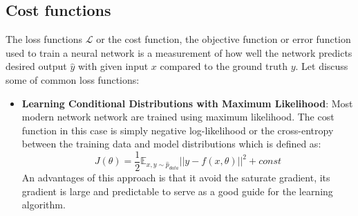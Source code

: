 \subsection{Cost functions}
\hspace{0.45cm}The loss functions $\mathcal{L}$ or the cost function, the objective function or error function used to 
train a neural network is a measurement of how well the network predicts desired output $\hat{y}$ with given input $x$ 
compared to the ground truth $y$\cite{Goodfellow-et-al-2016}. Let discuss some of common loss functions:
\begin{itemize}
    \item \textbf{Learning Conditional Distributions with Maximum Likelihood}:
    Most modern network network are trained using maximum likelihood\cite{Goodfellow-et-al-2016}. The cost function in this case is simply negative log-likelihood or the cross-entropy between the training data and model distributions which is defined as:
    \begin{equation}
        J(\theta) = \frac{1}{2}\mathbb{E}_{x,y\sim\hat{p}_{data}}||y-f(x,\theta)||^2 + const
     \end{equation}
     An advantages of this approach is that it avoid the saturate gradient, its gradient is large and predictable to serve as a good guide for the learning algorithm.\cite{Goodfellow-et-al-2016}
     

\end{itemize}
